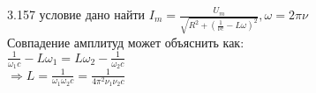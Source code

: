 \testCom
{%
	3.157
}
{%
	условие
}
{%
	дано
}
{%
	найти
}
{%
	$I_m = \frac{U_m}{\sqrt{R^2 + (\frac{1}{\nu c} - L\omega)^2}}, \omega = 2 \pi \nu$\\
	Совпадение амплитуд может объяснить как:\\
	$\frac{1}{\omega_1 c} - L \omega_1 = L \omega_2 - \frac{1}{\omega_2 c}$\\
	$\Rightarrow L = \frac{1}{\omega_1 \omega_2 c} = \frac{1}{4 \pi^2 \nu_1 \nu_2 c}$\\}

